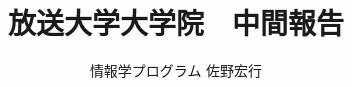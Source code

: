 \usepackage[dvipdfmx]{graphicx}
\usepackage[margin=30mm]{geometry}


\title{放送大学大学院　中間報告 }
\author{情報学プログラム 佐野宏行}
\maketitle